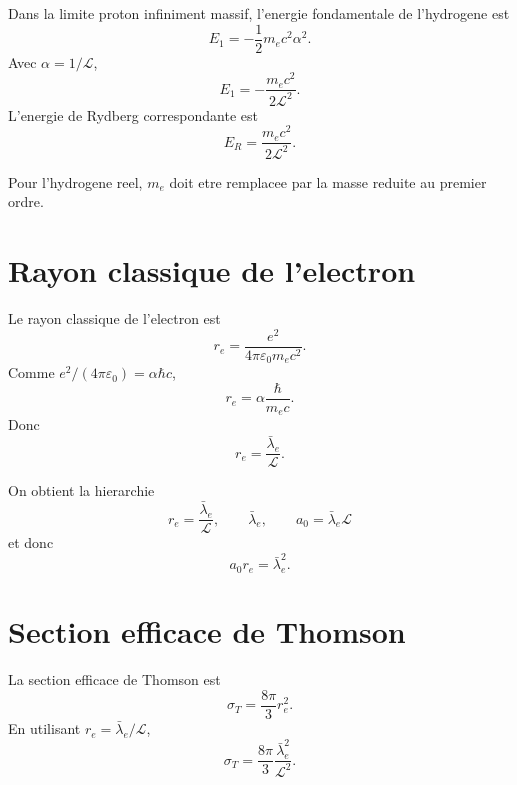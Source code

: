 \documentclass[11pt,a4paper]{article}
\newcommand{\cL}{\mathcal L}
\newcommand{\lambdabar}{\bar\lambda_e}
\newcommand{\epsz}{\varepsilon_0}
\begin{document}
Dans la limite proton infiniment massif, l'energie fondamentale de l'hydrogene
est
\begin{equation}
E_1=-\frac12 m_e c^2\alpha^2.
\end{equation}
Avec \(\alpha=1/\cL\),
\begin{equation}
\boxed{
E_1=-\frac{m_e c^2}{2\cL^2}.
}
\end{equation}
L'energie de Rydberg correspondante est
\begin{equation}
\boxed{
E_R=\frac{m_e c^2}{2\cL^2}.
}
\end{equation}

Pour l'hydrogene reel, \(m_e\) doit etre remplacee par la masse reduite au
premier ordre.

\section{Rayon classique de l'electron}

Le rayon classique de l'electron est
\begin{equation}
r_e=\frac{e^2}{4\pi\epsz m_e c^2}.
\end{equation}
Comme \(e^2/(4\pi\epsz)=\alpha\hbar c\),
\begin{equation}
r_e=\alpha\frac{\hbar}{m_e c}.
\end{equation}
Donc
\begin{equation}
\boxed{
r_e=\frac{\lambdabar}{\cL}.
}
\end{equation}

On obtient la hierarchie
\begin{equation}
\boxed{
r_e=\frac{\lambdabar}{\cL},
\qquad
\lambdabar,
\qquad
a_0=\lambdabar\cL
}
\end{equation}
et donc
\begin{equation}
\boxed{
a_0 r_e=\lambdabar^2.
}
\end{equation}

\section{Section efficace de Thomson}

La section efficace de Thomson est
\begin{equation}
\sigma_T=\frac{8\pi}{3}r_e^2.
\end{equation}
En utilisant \(r_e=\lambdabar/\cL\),
\begin{equation}
\boxed{
\sigma_T=\frac{8\pi}{3}\frac{\lambdabar^2}{\cL^2}.
}
\end{equation}
\end{document}
